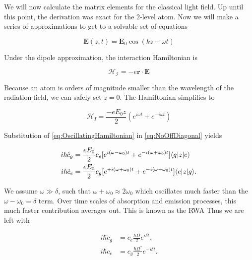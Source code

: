 We will now calculate the matrix elements for the classical light field. Up until this point, the derivation was exact for the 2-level atom. Now we will make a series of approximations to get to a solvable set of equations \cite{Leeuwen2017}

\begin{equation}\label{eq:CosineLightField}
	\mathbf{E}(z,t) = \mathbf{E}_0 \cos{(k z - \omega t)}
\end{equation}

Under the dipole approximation, the interaction Hamiltonian is \cite{Foot2005}

\begin{equation}
	\mathcal{H_I} = - e\mathbf{r}\cdot \mathbf{E}
\end{equation}

Because an atom is orders of magnitude smaller than the wavelength of the radiation field, we can safely set $z=0$. The Hamiltonian simplifies to 

\begin{equation}\label{eq:OscillatingHamiltonian}
	\mathcal{H}_I = \frac{-e E_0 z}{2} \left(e^{i \omega t} + e^{-i \omega t}\right)
\end{equation}

Substitution of \cref{eq:OscillatingHamiltonian} in \cref{eq:NoOffDiagonal} yields

\begin{subequations}\label{eq:ClassicalHamSubstituted}
	\begin{align}
		i \hbar \dot{c}_g &= \frac{e E_0}{2} c_e[e^{ i (\omega-\omega_0) t}+e^{-i(\omega+ \omega_0)t}] \langle g\rvert z \lvert e\rangle \\
		i \hbar \dot{c}_e &= \frac{e E_0}{2} c_g[e^{+i (\omega+\omega_0) t}+e^{-i(\omega- \omega_0)t}] \langle e\rvert z \lvert g\rangle  .
	\end{align}
\end{subequations}

We assume $\omega \gg \delta$, such that $\omega+\omega_0 \approx 2\omega_0$ which oscillates much faster than the $\omega-\omega_0=\delta$ term. Over time scales of absorption and emission processes, this much faster contribution averages out. This is known as the \ac{RWA} \cite{Vredenbregt2020,Loudon2000} Thus we are left with

\begin{subequations}\label{eq:Rabi}
	\begin{align}
		i \hbar \dot{c}_g &= c_e \frac{\hbar \Omega  }{2} e^{ i \delta t},\\
		i \hbar \dot{c}_e &= c_g \frac{\hbar \Omega^*}{2} e^{-i \delta t}.
	\end{align}
\end{subequations}

